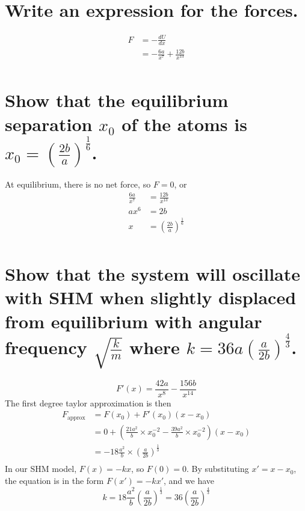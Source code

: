 \documentclass[answers]{exam}
\begin{document}
\begin{questions}
\begin{parts}
		\part{Write an expression for the forces.}
		\begin{solution}
			\begin{align*}
				F &= -\frac{dU}{dx} \\
				  &= -\frac{6a}{x^7} + \frac{12b}{x^{13}} \\
			\end{align*}
		\end{solution}
		\part{Show that the equilibrium separation $x_0$ of the atoms is $x_0 = \left(\frac{2b}{a}\right)^{\frac{1}{6}}$.}
		\begin{solution}
			At equilibrium, there is no net force, so $F = 0$, or
			\begin{align*}
				\frac{6a}{x^7} &= \frac{12b}{x^{13}} \\
				ax^6 &= 2b \\
				x &= \left(\frac{2b}{a}\right)^{\frac{1}{6}} \\
			\end{align*}
		\end{solution}
		\part{Show that the system will oscillate with SHM when slightly displaced from equilibrium with angular frequency $\sqrt{\frac{k}{m}}$ where $k=36a\left(\frac{a}{2b}\right)^{\frac{4}{3}}$.}
		\begin{solution}
			$$F'(x) = \frac{42a}{x^8} - \frac{156b}{x^{14}}$$
			The first degree taylor approximation is then
			\begin{align*}
				F_{\text{approx}} &= F(x_0) + F'(x_0)(x-x_0) \\
						  &= 0 + \left(\frac{21a^2}{b} \times x_0^{-2} - \frac{39a^2}{b} \times x_0^{-2}\right) (x-x_0) \\
						  &= -18 \frac{a^2}{b} \times \left(\frac{a}{2b}\right)^{\frac{1}{3}} \\
			\end{align*}
			In our SHM model, $F(x) = -kx$, so $F(0) = 0$. By substituting $x' = x-x_0$, the equation is in the form $F(x') = -kx'$, and we have
			$$k = 18 \frac{a^2}{b} \left(\frac{a}{2b}\right)^{\frac{1}{3}} = 36\left(\frac{a}{2b}\right)^{\frac{4}{3}}$$
		\end{solution}
	\end{parts}
			

\end{questions}
\end{document}

